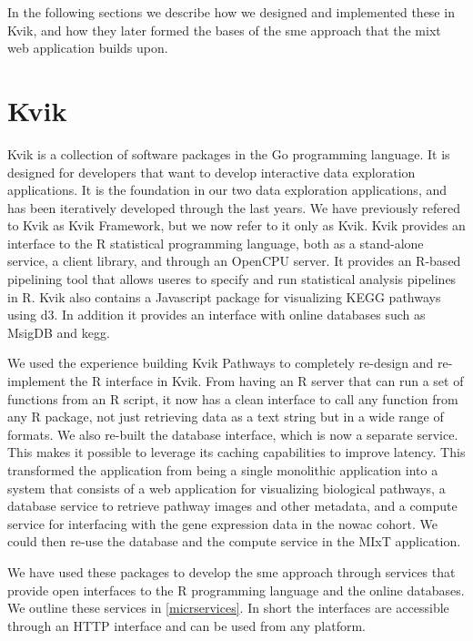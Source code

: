 In the following sections we describe how we designed and implemented these in
Kvik, and how they later formed the bases of the \gls{sme} approach
that the \gls{mixt} web application builds upon. 

\section{Kvik}\label{kviksec}
Kvik is a collection of software packages in the Go programming language. It is
designed for developers that want to develop interactive data exploration
applications. It is the foundation in our two data exploration applications, and
has been iteratively developed through the last years. We have previously
refered to Kvik as Kvik Framework\cite{fjukstad2015kvik}, but we now refer to it
only as Kvik.  Kvik provides an interface to the R statistical programming
language, both as a stand-alone service, a client library, and through an
OpenCPU server. It provides an R-based pipelining tool that allows useres to
specify and run statistical analysis pipelines in R.  Kvik also contains a
Javascript package for visualizing KEGG pathways using d3.\cite{d3}  In addition
it provides an interface with online databases such as MsigDB\cite{msigdb} and
\gls{kegg}\cite{kegg}.

We used the experience building Kvik Pathways to completely re-design and
re-implement the R interface in Kvik. From having an R server that can run a
set of functions from an R script, it now has a clean interface to call any
function from any R package, not just retrieving data as a text string but in a
wide range of formats. We also re-built the database interface, which is now a
separate service. This makes it possible to leverage its caching capabilities
to improve latency. This transformed the application from being a single
monolithic application into a system that consists of a web application for
visualizing biological pathways, a database service to retrieve pathway images
and other metadata, and a compute service for interfacing with the gene
expression data in the \gls{nowac} cohort. We could then re-use the database and the
compute service in the MIxT application. 

We have used these packages to develop the \gls{sme} approach through services
that provide open interfaces to the R programming language and the online
databases.  We outline these services in \ref{micrservices}.  In short the
interfaces are accessible through an HTTP interface and can be used from any
platform.

